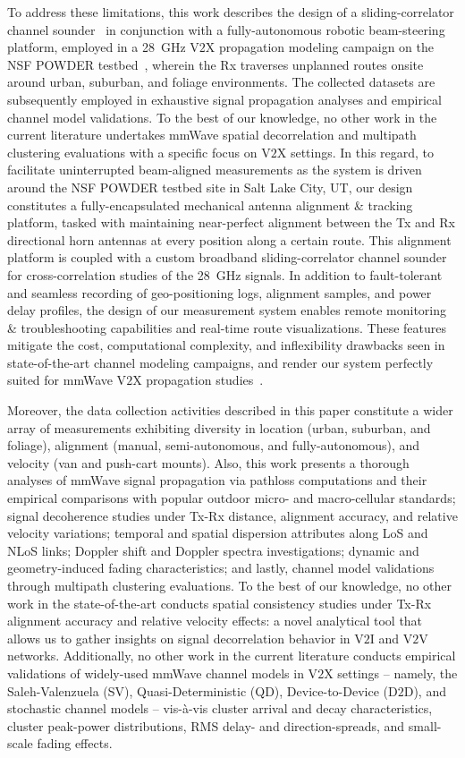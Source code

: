 \documentclass[12pt, draftcls, onecolumn]{IEEEtran}
\begin{document}
To address these limitations, this work describes the design of a sliding-correlator channel sounder~\cite{Sounder} in conjunction with a fully-autonomous robotic beam-steering platform, employed in a \SI{28}{\giga\hertz} V$2$X propagation modeling campaign on the NSF POWDER testbed~\cite{POWDER, POWDER_RF}, wherein the Rx traverses unplanned routes onsite around urban, suburban, and foliage environments. The collected datasets are subsequently employed in exhaustive signal propagation analyses and empirical channel model validations. To the best of our knowledge, no other work in the current literature undertakes mmWave spatial decorrelation and multipath clustering evaluations with a specific focus on V$2$X settings. In this regard, to facilitate uninterrupted beam-aligned measurements as the system is driven around the NSF POWDER testbed site in Salt Lake City, UT, our design constitutes a fully-encapsulated mechanical antenna alignment \& tracking platform, tasked with maintaining near-perfect alignment between the Tx and Rx directional horn antennas at every position along a certain route. This alignment platform is coupled with a custom broadband sliding-correlator channel sounder for cross-correlation studies of the \SI{28}{\giga\hertz} signals. In addition to fault-tolerant and seamless recording of geo-positioning logs, alignment samples, and power delay profiles, the design of our measurement system enables remote monitoring \& troubleshooting capabilities and real-time route visualizations. These features mitigate the cost, computational complexity, and inflexibility drawbacks seen in state-of-the-art channel modeling campaigns, and render our system perfectly suited for mmWave V$2$X propagation studies~\cite{SPAVE_ICC}.

Moreover, the data collection activities described in this paper constitute a wider array of measurements exhibiting diversity in location (urban, suburban, and foliage), alignment (manual, semi-autonomous, and fully-autonomous), and velocity (van and push-cart mounts). Also, this work presents a thorough analyses of mmWave signal propagation via pathloss computations and their empirical comparisons with popular outdoor micro- and macro-cellular standards; signal decoherence studies under Tx-Rx distance, alignment accuracy, and relative velocity variations; temporal and spatial dispersion attributes along LoS and NLoS links; Doppler shift and Doppler spectra investigations; dynamic and geometry-induced fading characteristics; and lastly, channel model validations through multipath clustering evaluations. To the best of our knowledge, no other work in the state-of-the-art conducts spatial consistency studies under Tx-Rx alignment accuracy and relative velocity effects: a novel analytical tool that allows us to gather insights on signal decorrelation behavior in V$2$I and V$2$V networks. Additionally, no other work in the current literature conducts empirical validations of widely-used mmWave channel models in V$2$X settings -- namely, the Saleh-Valenzuela (SV), Quasi-Deterministic (QD), Device-to-Device (D$2$D), and stochastic channel models -- vis-\`{a}-vis cluster arrival and decay characteristics, cluster peak-power distributions, RMS delay- and direction-spreads, and small-scale fading effects.
\end{document}
